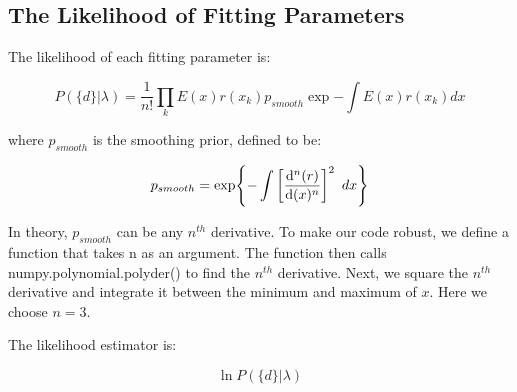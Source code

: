 \subsection{The Likelihood of Fitting Parameters}
\label{subsec:likelihood}

The likelihood of each fitting parameter is:

\begin{equation}
\label{likelihood}
P(\{d\}|\lambda) = \frac{1}{n!}\prod_{k} E(x)r(x_k) p_{smooth}\exp{-\int E(x)r(x_k)dx}
\end{equation}

where $p_{smooth}$ is the smoothing prior, defined to be:

\begin{equation}
\label{smoothing_prior}
p_{smooth} = \exp{-\int \bigg[\dv[n]{(r)}{(x)}\bigg]^2 \hspace{5pt} dx}
\end{equation}

In theory, $p_{smooth}$ can be any $n^{th}$ derivative. To make our code robust, we define a function that takes n as an argument. The function then calls numpy.polynomial.polyder() to find the $n^{th}$ derivative. Next, we square the $n^{th}$ derivative and integrate it between the minimum and maximum of $x$. Here we choose $n = 3$.

The likelihood estimator is:

\begin{equation}
\label{likelihood_estimator}
\ln{P(\{d\}|\lambda)}
\end{equation}

